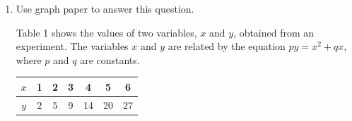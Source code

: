 \documentclass{report}
\newcommand{\sol}{\textbf{Solution:}}
\begin{document}
\begin{enumerate}[leftmargin=*]
\begin{enumerate}
\begin{enumerate}
                              \sol{}
                              \begin{align*}
                                  y'           & = 3x^2 - 9x - 12 = 0   \\
                                  x^2 - 3x - 4 & = 0                    \\
                                  (x-4)(x+1)   & = 0                    \\
                                  x            & = 4\ \text{or}\ x = -1
                              \end{align*}
                              When $x=4$, $y=4^3-\dfrac{9}{2}(4)^2-12(4)+5=-51$. \\
                              When $x=-1$, $y=(-1)^3-\dfrac{9}{2}(-1)^2-12(-1)+5=\dfrac{23}{2}$. \\
                              The coordinates of the turning points are $(4,-51)$ and $\left(-1,\dfrac{23}{2}\right)$.

                        \item whether each turning point is a maximum or minimum point.

                              \sol{}
                              \begin{align*}
                                  y''(x)  & = 6x - 9          \\
                                  y''(4)  & = 6(4) - 9 = 15   \\
                                  y''(-1) & = 6(-1) - 9 = -15
                              \end{align*}
                              The turning point $(4,-51)$ is a minimum point and the turning point $\left(-1,\dfrac{23}{2}\right)$ is a maximum point.

                    \end{enumerate}
          \end{enumerate}
    \item Use graph paper to answer this question.

          Table 1 shows the values of two variables, $x$ and $y$, obtained from an
          experiment. The variables $x$ and $y$ are related by the equation $p y=x^2+q
              x$, where $p$ and $q$ are constants.

          \begin{center}
              \begin{tabular}{|c|c|c|c|c|c|c|}
                  \hline$x$ & 1 & 2 & 3 & 4  & 5  & 6  \\
                  \hline$y$ & 2 & 5 & 9 & 14 & 20 & 27 \\
                  \hline
              \end{tabular}
          \end{center}


\end{enumerate}
\end{document}
